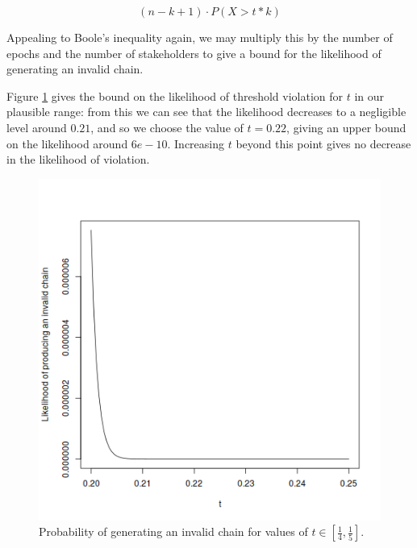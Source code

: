 \documentclass[11pt,a4paper]{article}
\begin{document}
\begin{appendices}
  $$(n-k+1)\cdot P(X > t*k)$$

  Appealing to Boole's inequality again, we may multiply this by the number of
  epochs and the number of stakeholders to give a bound for the likelihood of
  generating an invalid chain.

  Figure \ref{fig:calculating-t} gives the bound on the likelihood of threshold
  violation for $t$ in our plausible range: from this we can see that the
  likelihood decreases to a negligible level around $0.21$, and so we choose the
  value of $t=0.22$, giving an upper bound on the likelihood around $6e-10$.
  Increasing $t$ beyond this point gives no decrease in the likelihood of
  violation.

  \begin{figure}[ht]
    \begin{center}
      \includegraphics[scale=0.5]{calculating-t.png}
    \end{center}
    \caption{Probability of generating an invalid chain for values of $t\in\left[
        \frac{1}{4}, \frac{1}{5} \right]$.}
    \label{fig:calculating-t}
  \end{figure}

\end{appendices}
\end{document}
